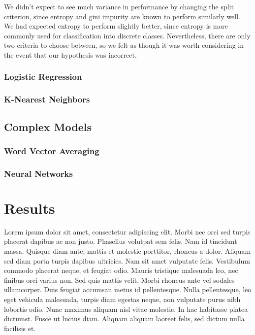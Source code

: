 \documentclass[conference]{IEEEtran}
\begin{document}
We didn't expect to see much variance in performance by changing the split criterion, since entropy and gini impurity are known to perform similarly well. We had expected entropy to perform slightly better, since entropy is more commonly used for classification into discrete classes. Nevertheless, there are only two criteria to choose between, so we felt as though it was worth considering in the event that our hypothesis was incorrect.

\subsubsection{Logistic Regression}


\subsubsection{K-Nearest Neighbors}


\subsection{Complex Models}


\subsubsection{Word Vector Averaging}


\subsubsection{Neural Networks}

\section{Results}

Lorem ipsum dolor sit amet, consectetur adipiscing elit. Morbi nec orci sed turpis placerat dapibus ac non justo. Phasellus volutpat sem felis. Nam id tincidunt massa. Quisque diam ante, mattis et molestie porttitor, rhoncus a dolor. Aliquam sed diam porta turpis dapibus ultricies. Nam sit amet vulputate felis. Vestibulum commodo placerat neque, et feugiat odio. Mauris tristique malesuada leo, nec finibus orci varius non. Sed quis mattis velit. Morbi rhoncus ante vel sodales ullamcorper. Duis feugiat accumsan metus id pellentesque. Nulla pellentesque, leo eget vehicula malesuada, turpis diam egestas neque, non vulputate purus nibh lobortis odio. Nunc maximus aliquam nisl vitae molestie. In hac habitasse platea dictumst. Fusce ut luctus diam. Aliquam aliquam laoreet felis, sed dictum nulla facilisis et.
\end{document}
